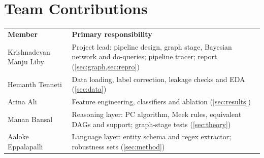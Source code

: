 \documentclass[11pt,a4paper]{article}
\newcommand{\MemberA}{Krishnadevan Manju Liby}
\newcommand{\MemberB}{Hemanth Tenneti}
\newcommand{\MemberC}{Arina Ali}
\newcommand{\MemberD}{Manan Bansal}
\newcommand{\MemberE}{Aaloke Eppalapalli}
\newcommand{\thead}[1]{\leavevmode\sffamily\bfseries\color{white}#1}
\newcommand{\headrow}{\rowcolor{ink}}
\begin{document}
\section*{Team Contributions}
\begin{table}[!htbp]
\centering\small
\begin{tabularx}{\linewidth}{@{}lX@{}}
\headrow \thead{Member} & \thead{Primary responsibility} \\
\MemberA & Project lead: pipeline design, graph stage, Bayesian network and do-queries; pipeline tracer; report (\cref{sec:graph,sec:repro}) \\
\rowcolor{mist} \MemberB & Data loading, label correction, leakage checks and EDA (\cref{sec:data}) \\
\MemberC & Feature engineering, classifiers and ablation (\cref{sec:results}) \\
\rowcolor{mist} \MemberD & Reasoning layer: PC algorithm, Meek rules, equivalent DAGs and support; graph-stage tests (\cref{sec:theory}) \\
\MemberE & Language layer: entity schema and regex extractor; robustness sets (\cref{sec:method}) \\
\end{tabularx}
\end{table}
\end{document}
